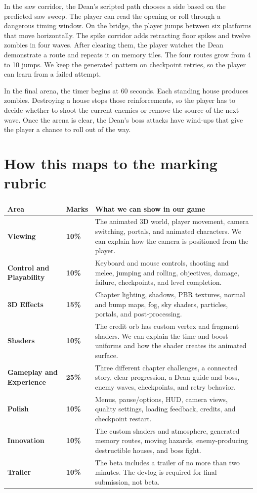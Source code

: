 \documentclass[11pt,a4paper]{article}
\begin{document}
In the saw corridor, the Dean's scripted path chooses a side based on the predicted saw sweep. The player can read the opening or roll through a dangerous timing window. On the bridge, the player jumps between six platforms that move horizontally. The spike corridor adds retracting floor spikes and twelve zombies in four waves. After clearing them, the player watches the Dean demonstrate a route and repeats it on memory tiles. The four routes grow from 4 to 10 jumps. We keep the generated pattern on checkpoint retries, so the player can learn from a failed attempt.

In the final arena, the timer begins at 60 seconds. Each standing house produces zombies. Destroying a house stops those reinforcements, so the player has to decide whether to shoot the current enemies or remove the source of the next wave. Once the arena is clear, the Dean's boss attacks have wind-ups that give the player a chance to roll out of the way.

\section{How this maps to the marking rubric}

\begin{tabularx}{\textwidth}{>{\bfseries}p{} >{\bfseries}p{} X}
  \toprule
  Area & Marks & What we can show in our game \\
  \midrule
  Viewing & 10\% & The animated 3D world, player movement, camera switching, portals, and animated characters. We can explain how the camera is positioned from the player. \\
  Control and Playability & 10\% & Keyboard and mouse controls, shooting and melee, jumping and rolling, objectives, damage, failure, checkpoints, and level completion. \\
  3D Effects & 15\% & Chapter lighting, shadows, PBR textures, normal and bump maps, fog, sky shaders, particles, portals, and post-processing. \\
  Shaders & 10\% & The credit orb has custom vertex and fragment shaders. We can explain the time and boost uniforms and how the shader creates its animated surface. \\
  Gameplay and Experience & 25\% & Three different chapter challenges, a connected story, clear progression, a Dean guide and boss, enemy waves, checkpoints, and retry behavior. \\
  Polish & 10\% & Menus, pause/options, HUD, camera views, quality settings, loading feedback, credits, and checkpoint restart. \\
  Innovation & 10\% & The custom shaders and atmosphere, generated memory routes, moving hazards, enemy-producing destructible houses, and boss fight. \\
  Trailer & 10\% & The beta includes a trailer of no more than two minutes. The devlog is required for final submission, not beta. \\
  \bottomrule
\end{tabularx}
\end{document}
